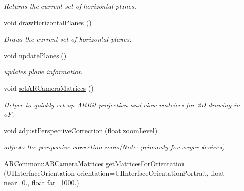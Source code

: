 \begin{DoxyCompactItemize}
\begin{DoxyCompactList}\small\item\em Returns the current set of horizontal planes. \end{DoxyCompactList}\item 
\mbox{\label{class_a_r_processor_a6a61a7e03821410bc1a715fd32159662}} 
void \hyperlink{class_a_r_processor_a6a61a7e03821410bc1a715fd32159662}{draw\+Horizontal\+Planes} ()
\begin{DoxyCompactList}\small\item\em Draws the current set of horizontal planes. \end{DoxyCompactList}\item 
\mbox{\label{class_a_r_processor_aaa1488d9082ec598fd4aeb5c5c43d999}} 
void \hyperlink{class_a_r_processor_aaa1488d9082ec598fd4aeb5c5c43d999}{update\+Planes} ()
\begin{DoxyCompactList}\small\item\em updates plane information \end{DoxyCompactList}\item 
\mbox{\label{class_a_r_processor_a2ffd8b9518388be29eba6affe4d4d152}} 
void \hyperlink{class_a_r_processor_a2ffd8b9518388be29eba6affe4d4d152}{set\+A\+R\+Camera\+Matrices} ()
\begin{DoxyCompactList}\small\item\em Helper to quickly set up A\+R\+Kit projection and view matrices for 2D drawing in oF. \end{DoxyCompactList}\item 
\mbox{\label{class_a_r_processor_a17fbdf84c8e82e7f781ea0228d77dfea}} 
void \hyperlink{class_a_r_processor_a17fbdf84c8e82e7f781ea0228d77dfea}{adjust\+Perspective\+Correction} (float zoom\+Level)
\begin{DoxyCompactList}\small\item\em adjusts the perspective correction zoom(\+Note\+: primarily for larger devices) \end{DoxyCompactList}\item 
\mbox{\label{class_a_r_processor_abcd684d805e880aed72c2eb56a65978f}} 
\hyperlink{struct_a_r_common_1_1_a_r_camera_matrices}{A\+R\+Common\+::\+A\+R\+Camera\+Matrices} \hyperlink{class_a_r_processor_abcd684d805e880aed72c2eb56a65978f}{get\+Matrices\+For\+Orientation} (U\+I\+Interface\+Orientation orientation=U\+I\+Interface\+Orientation\+Portrait, float near=0., float far=1000.)

\end{DoxyCompactItemize}
